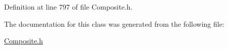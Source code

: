 Definition at line 797 of file Composite.\+h.



The documentation for this class was generated from the following file\+:\begin{DoxyCompactItemize}
\item 
\hyperlink{Composite_8h}{Composite.\+h}\end{DoxyCompactItemize}
